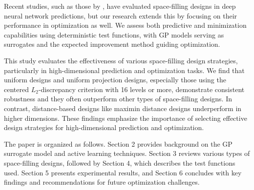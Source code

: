 \documentclass [PhD] {package/uclathes}
\begin{document}
Recent studies, such as those by \textcite{shi2023evaluating}, have evaluated space-filling designs in deep neural network predictions, but our research extends this by focusing on their performance in optimization as well. We assess both predictive and minimization capabilities using deterministic test functions, with GP models serving as surrogates and the expected improvement method guiding optimization.

This study evaluates the effectiveness of various space-filling design strategies, particularly in high-dimensional prediction and optimization tasks. %
We find that uniform designs and uniform projection designs, especially those using the centered $L_2$-discrepancy criterion with 16 levels or more,  demonstrate consistent robustness and they often outperform other types of space-filling designs. In contrast, distance-based designs like maximin distance designs underperform in higher dimensions.
These findings emphasize the importance of selecting effective design strategies for high-dimensional prediction and optimization.



The paper is organized as follows.
Section 2 provides background on the GP surrogate model and active learning techniques. Section 3 reviews various types of space-filling designs, followed by Section 4, which describes the test functions used. Section 5 presents experimental results, and Section 6 concludes with key findings and recommendations for future optimization challenges.
\end{document}
